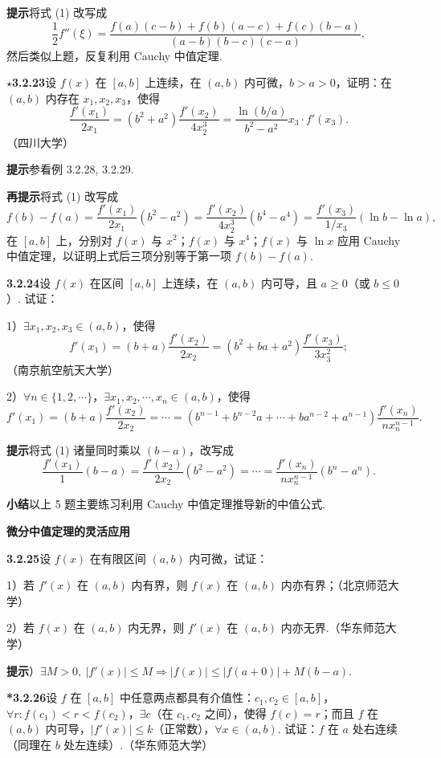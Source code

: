 \documentclass[UTF8,12pt,a4paper,fontset=fandol]{ctexart}
\begin{document}
\noindent\textbf{提示}\quad 将式 (1) 改写成
\[
  \frac12f''(\xi)=
  \frac{f(a)(c-b)+f(b)(a-c)+f(c)(b-a)}
  {(a-b)(b-c)(c-a)},
\]
然后类似上题，反复利用 Cauchy 中值定理.

\noindent\textbf{$\star$3.2.23}\quad 设 $f(x)$ 在 $[a,b]$ 上连续，在 $(a,b)$ 内可微，$b>a>0$，证明：在 $(a,b)$ 内存在 $x_1,x_2,x_3$，使得
\[
  \frac{f'(x_1)}{2x_1}
  =(b^2+a^2)\frac{f'(x_2)}{4x_2^3}
  =\frac{\ln(b/a)}{b^2-a^2}x_3\cdot f'(x_3).
\tag{1}
\]
（四川大学）

\noindent\textbf{提示}\quad 参看例 3.2.28, 3.2.29.

\noindent\textbf{再提示}\quad 将式 (1) 改写成
\[
  f(b)-f(a)
  =
  \frac{f'(x_1)}{2x_1}(b^2-a^2)
  =
  \frac{f'(x_2)}{4x_2^3}(b^4-a^4)
  =
  \frac{f'(x_3)}{1/x_3}(\ln b-\ln a),
\]
在 $[a,b]$ 上，分别对 $f(x)$ 与 $x^2$；$f(x)$ 与 $x^4$；$f(x)$ 与 $\ln x$ 应用 Cauchy 中值定理，以证明上式后三项分别等于第一项 $f(b)-f(a)$.

\noindent\textbf{3.2.24}\quad 设 $f(x)$ 在区间 $[a,b]$ 上连续，在 $(a,b)$ 内可导，且 $a\ge0$（或 $b\le0$）. 试证：

1）$\exists x_1,x_2,x_3\in(a,b)$，使得
\[
  f'(x_1)=(b+a)\frac{f'(x_2)}{2x_2}
  =(b^2+ba+a^2)\frac{f'(x_3)}{3x_3^2};
\]
（南京航空航天大学）

2）$\forall n\in\{1,2,\cdots\}$，$\exists x_1,x_2,\cdots,x_n\in(a,b)$，使得
\[
  f'(x_1)=(b+a)\frac{f'(x_2)}{2x_2}
  =\cdots
  =(b^{n-1}+b^{n-2}a+\cdots+ba^{n-2}+a^{n-1})\frac{f'(x_n)}{nx_n^{n-1}}.
\tag{1}
\]

\noindent\textbf{提示}\quad 将式 (1) 诸量同时乘以 $(b-a)$，改写成
\[
  \frac{f'(x_1)}1(b-a)
  =\frac{f'(x_2)}{2x_2}(b^2-a^2)
  =\cdots
  =\frac{f'(x_n)}{nx_n^{n-1}}(b^n-a^n).
\]

\noindent\textbf{小结}\quad 以上 5 题主要练习利用 Cauchy 中值定理推导新的中值公式.

\noindent\textbf{微分中值定理的灵活应用}

\noindent\textbf{3.2.25}\quad 设 $f(x)$ 在有限区间 $(a,b)$ 内可微，试证：

1）若 $f'(x)$ 在 $(a,b)$ 内有界，则 $f(x)$ 在 $(a,b)$ 内亦有界；（北京师范大学）

2）若 $f(x)$ 在 $(a,b)$ 内无界，则 $f'(x)$ 在 $(a,b)$ 内亦无界.（华东师范大学）

\noindent\textbf{提示}）$\exists M>0,\ |f'(x)|\le M\Rightarrow |f(x)|\le |f(a+0)|+M(b-a)$.

\noindent\textbf{*3.2.26}\quad 设 $f$ 在 $[a,b]$ 中任意两点都具有介值性：$c_1,c_2\in[a,b]$，$\forall r:f(c_1)<r<f(c_2)$，$\exists c$（在 $c_1,c_2$ 之间），使得 $f(c)=r$；而且 $f$ 在 $(a,b)$ 内可导，$|f'(x)|\le k$（正常数），$\forall x\in(a,b)$. 试证：$f$ 在 $a$ 处右连续（同理在 $b$ 处左连续）.（华东师范大学）
\end{document}
